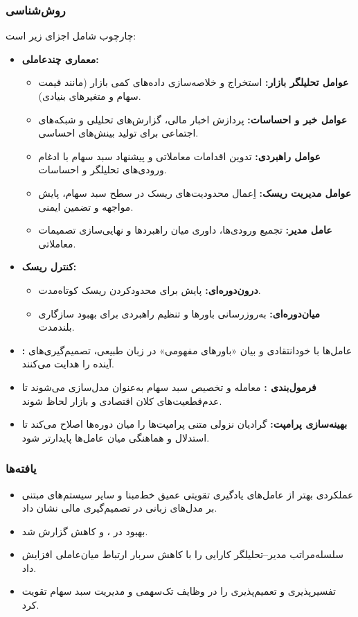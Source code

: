\documentclass[12pt, a4paper]{report}
\begin{document}
\subsubsection{روش‌شناسی}
چارچوب  شامل اجزای زیر است:
\begin{itemize}
    \item \textbf{معماری چندعاملی:}  
    \begin{itemize}
        \item \textbf{عوامل تحلیلگر بازار:} استخراج و خلاصه‌سازی داده‌های کمی بازار (مانند قیمت سهام و متغیرهای بنیادی).  
        \item \textbf{عوامل خبر و احساسات:} پردازش اخبار مالی، گزارش‌های تحلیلی و شبکه‌های اجتماعی برای تولید بینش‌های احساسی.  
        \item \textbf{عوامل راهبردی:} تدوین اقدامات معاملاتی و پیشنهاد سبد سهام با ادغام ورودی‌های تحلیلگر و احساسات.  
        \item \textbf{عوامل مدیریت ریسک:} اِعمال محدودیت‌های ریسک در سطح سبد سهام، پایش مواجهه و تضمین ایمنی.  
        \item \textbf{عامل مدیر:} تجمیع ورودی‌ها، داوری میان راهبردها و نهایی‌سازی تصمیمات معاملاتی.  
    \end{itemize}
    \item \textbf{کنترل ریسک:}  
    \begin{itemize}
        \item \textbf{درون‌دوره‌ای:} پایش  برای محدودکردن ریسک کوتاه‌مدت.  
        \item \textbf{میان‌دوره‌ای:} به‌روزرسانی باورها و تنظیم راهبردی برای بهبود سازگاری بلندمدت.  
    \end{itemize}
    \item \textbf{:} عامل‌ها با خودانتقادی و بیان «باورهای مفهومی» در زبان طبیعی، تصمیم‌گیری‌های آینده را هدایت می‌کنند.  
    \item \textbf{فرمول‌بندی :} معامله و تخصیص سبد سهام به‌عنوان  مدل‌سازی می‌شوند تا عدم‌قطعیت‌های کلان اقتصادی و بازار لحاظ شوند.  
    \item \textbf{بهینه‌سازی پرامپت:} گرادیان نزولی متنی پرامپت‌ها را میان دوره‌ها اصلاح می‌کند تا استدلال و هماهنگی میان عامل‌ها پایدارتر شود.  
\end{itemize}

\subsubsection{یافته‌ها}
\begin{itemize}
    \item عملکردی بهتر از عامل‌های یادگیری تقویتی عمیق خط‌مبنا و سایر سیستم‌های مبتنی بر مدل‌های زبانی در تصمیم‌گیری مالی نشان داد.  
    \item بهبود در ،  و کاهش  گزارش شد.  
    \item سلسله‌مراتب مدیر–تحلیلگر کارایی را با کاهش سربار ارتباط میان‌عاملی افزایش داد.  
    \item {} تفسیرپذیری و تعمیم‌پذیری را در وظایف تک‌سهمی و مدیریت سبد سهام تقویت کرد.  
\end{itemize}
\end{document}
